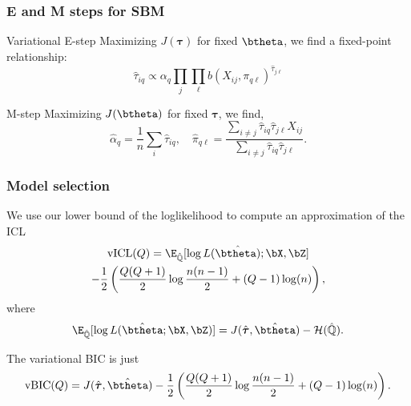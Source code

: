 \documentclass{beamer}\usepackage[]{graphicx}\usepackage[]{color}
\begin{document}
\begin{frame}
  \frametitle{E and M steps for SBM}

  \begin{block}{Variational E-step}
    Maximizing $J(\boldsymbol\tau)$ for fixed $\btheta$, we find a fixed-point relationship:
    \begin{equation*}
      \hat{\tau}_{iq} \varpropto \alpha_q \prod_{j} \prod_{\ell} b(X_{ij}, \pi_{q\ell})^{\hat{\tau}_{j\ell}}
    \end{equation*}
  \end{block}

  \vfill

  \begin{block}{M-step}
    Maximizing $J(\btheta)$ for fixed $\boldsymbol\tau$, we find,
    \begin{equation*}
\hat{\alpha}_q = \frac{1}{n}\sum_i \hat{\tau}_{iq} , \quad \hat\pi_{q\ell} = \frac{\sum_{i\neq j} \hat{\tau}_{iq}\hat{\tau}_{j\ell} X_{ij}}{\sum_{i\neq j} \hat{\tau}_{iq}\hat{\tau}_{j\ell}}.
\end{equation*}
  \end{block}

\end{frame}

\begin{frame}
  \frametitle{Model selection}

  We use our lower bound of the  loglikelihood to compute an approximation of the ICL
  \begin{multline*}
  \mathrm{vICL}(Q) = \E_{\hat{\mathbb{Q}}} [\log L(\hat{\btheta)};\bX,\bZ] \\ - \frac{1}{2} \left(\frac{Q(Q+1)}{2} \log \frac{n(n-1)}{2} + (Q-1) \log (n) \right),
\end{multline*}
where
    \begin{equation*}
      \E_{\hat{\mathbb{Q}}} [\log L(\hat\btheta; \bX,\bZ)] = J(\hat{\boldsymbol\tau},\hat\btheta) - \mathcal{H}(\hat{\mathbb{Q}}).
    \end{equation*}

    The variational BIC is just
    \begin{equation*}
  \mathrm{vBIC}(Q) = J(\hat{\boldsymbol\tau},\hat\btheta) - \frac{1}{2} \left(\frac{Q(Q+1)}{2} \log \frac{n(n-1)}{2} + (Q-1) \log (n) \right).
    \end{equation*}

\end{frame}
\end{document}
